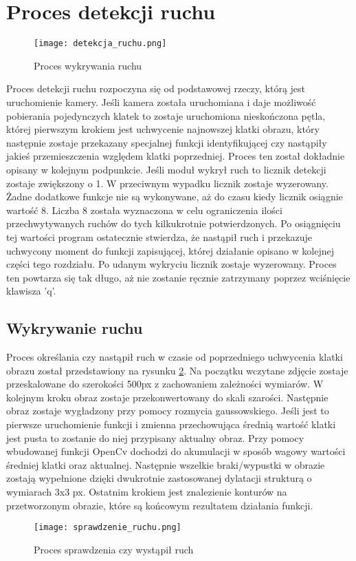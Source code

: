 \section{Proces detekcji ruchu}
\begin{figure}[H]
	\centering
	\texttt{[image: detekcja\_ruchu.png]}
	\caption{Proces wykrywania ruchu}
	\label{fig:proces_detekcji}
\end{figure}
Proces detekcji ruchu rozpoczyna się od podstawowej rzeczy, którą jest uruchomienie kamery. Jeśli kamera została uruchomiana i daje możliwość pobierania pojedynczych klatek to zostaje uruchomiona nieskończona pętla, której pierwszym krokiem jest uchwycenie najnowszej klatki obrazu, który następnie zostaje przekazany specjalnej funkcji identyfikującej czy nastąpiły jakieś przemieszczenia względem klatki poprzedniej. Proces ten został dokładnie opisany w kolejnym podpunkcie. Jeśli moduł wykrył ruch to licznik detekcji zostaje zwiększony o 1. W przeciwnym wypadku licznik zostaje wyzerowany. Żadne dodatkowe funkcje nie są wykonywane, aż do czasu kiedy licznik osiągnie wartość 8. Liczba 8 została wyznaczona w celu ograniczenia ilości przechwytywanych ruchów do tych kilkukrotnie potwierdzonych. Po osiągnięciu tej wartości program ostatecznie stwierdza, że nastąpił ruch i przekazuje uchwycony moment do funkcji zapisującej, której działanie opisano w kolejnej części tego rozdziału. Po udanym wykryciu licznik zostaje wyzerowany. Proces ten powtarza się tak długo, aż nie zostanie ręcznie zatrzymany poprzez wciśnięcie klawisza 'q'.

\subsection{Wykrywanie ruchu}
Proces określania czy nastąpił ruch w czasie od poprzedniego uchwycenia klatki obrazu został przedstawiony na rysunku \ref{fig:wykrywanie_ruchu}. Na początku wczytane zdjęcie zostaje przeskalowane do szerokości 500px z zachowaniem zależności wymiarów. W kolejnym kroku obraz zostaje przekonwertowany do skali szarości. Następnie obraz zostaje wygładzony przy pomocy rozmycia gaussowskiego. Jeśli jest to pierwsze uruchomienie funkcji i zmienna przechowująca średnią wartość klatki jest pusta to zostanie do niej przypisany aktualny obraz. Przy pomocy wbudowanej funkcji OpenCv dochodzi do akumulacji w sposób wagowy wartości średniej klatki oraz aktualnej. Następnie wszelkie braki/wypustki w obrazie zostają wypełnione dzięki dwukrotnie zastosowanej dylatacji strukturą o wymiarach 3x3 px. Ostatnim krokiem jest znalezienie konturów na przetworzonym obrazie, które są końcowym rezultatem działania funkcji.
 \begin{figure}[H]
	\centering
	\texttt{[image: sprawdzenie\_ruchu.png]}
	\caption{Proces sprawdzenia czy wystąpił ruch}
	\label{fig:wykrywanie_ruchu}
\end{figure}

